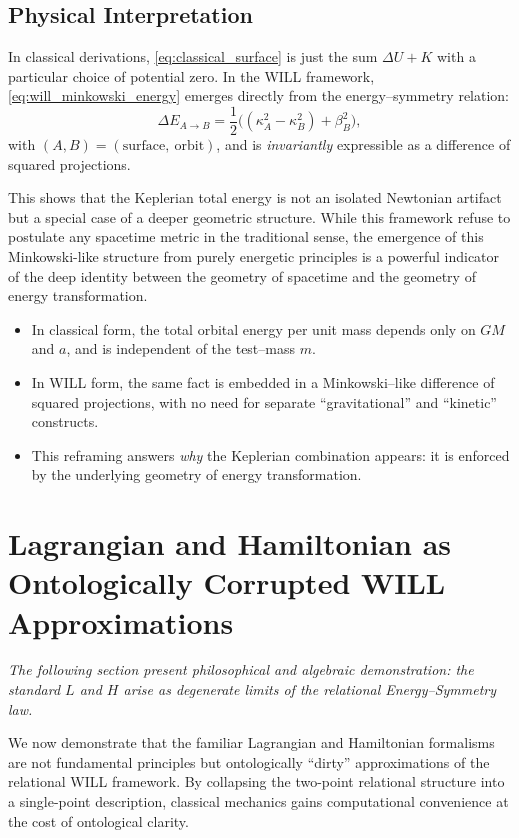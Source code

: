 \documentclass[12pt, a4paper]{article}
\begin{document}
\subsection{Physical Interpretation}

In classical derivations, \eqref{eq:classical_surface} is just the sum
$\Delta U + K$ with a particular choice of potential zero.
In the WILL framework, \eqref{eq:will_minkowski_energy} emerges directly from the
energy--symmetry relation:
\[
\Delta E_{A\to B}
= \frac12\bigl((\kappa_A^2 - \kappa_B^2) + \beta_B^2\bigr),
\]
with $(A,B) = (\text{surface},\ \text{orbit})$,
and is \emph{invariantly} expressible as a difference of squared projections.

This shows that the Keplerian total energy is not an isolated Newtonian
artifact but a special case of a deeper geometric structure. 
While this framework refuse to postulate any spacetime metric in the traditional sense, the emergence of this Minkowski-like structure from purely energetic principles is a powerful indicator of the deep identity between the geometry of spacetime and the geometry of energy transformation. 

\begin{tcolorbox}[colback=gray!5, colframe=black!80!black, title=Why This Matters]
\begin{itemize}
\item In classical form, the total orbital energy per unit mass depends only on
$GM$ and $a$, and is independent of the test--mass $m$.
\item In WILL form, the same fact is embedded in a Minkowski--like difference
of squared projections, with no need for separate ``gravitational'' and
``kinetic'' constructs.
\item This reframing answers \emph{why} the Keplerian combination appears:
it is enforced by the underlying geometry of energy transformation.
\end{itemize}
\end{tcolorbox}


\section{Lagrangian and Hamiltonian as Ontologically Corrupted WILL Approximations}
\textit{The following section present philosophical and algebraic 
demonstration: the standard $L$ and $H$ arise as degenerate limits of the relational 
Energy–Symmetry law.}

We now demonstrate that the familiar Lagrangian and Hamiltonian formalisms 
are not fundamental principles but ontologically ``dirty'' approximations of 
the relational WILL framework. By collapsing the two-point relational structure 
into a single-point description, classical mechanics gains computational convenience 
at the cost of ontological clarity.
\end{document}
